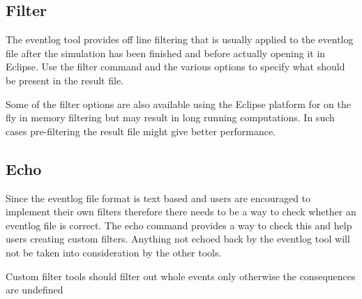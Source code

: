 \subsection{Filter}
The eventlog tool provides off line filtering that is usually applied to the
eventlog file after the simulation has been finished and before actually opening
it in Eclipse. Use the filter command and the various options to specify what
should be present in the result file.

Some of the filter options are also available using the Eclipse platform for on
the fly in memory filtering but may result in long running computations. In such
cases pre-filtering the result file might give better performance.

\subsection{Echo}
Since the eventlog file format is text based and users are encouraged to implement
their own filters therefore there needs to be a way to check whether an eventlog
file is correct. The echo command provides a way to check this and help users
creating custom filters. Anything not echoed back by the eventlog tool will not be
taken into consideration by the other tools.
\begin{note}
Custom filter tools should filter out whole events only otherwise the consequences
are undefined
\end{note}

